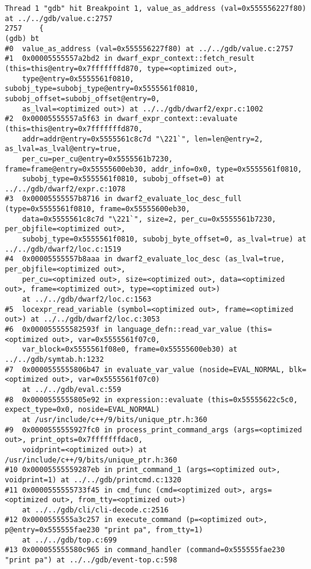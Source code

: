 \documentclass{report}
\begin{document}
\begin{verbatim}
Thread 1 "gdb" hit Breakpoint 1, value_as_address (val=0x555556227f80) at ../../gdb/value.c:2757
2757	{
(gdb) bt
#0  value_as_address (val=0x555556227f80) at ../../gdb/value.c:2757
#1  0x00005555557a2bd2 in dwarf_expr_context::fetch_result (this=this@entry=0x7fffffffd870, type=<optimized out>, 
    type@entry=0x5555561f0810, subobj_type=subobj_type@entry=0x5555561f0810, subobj_offset=subobj_offset@entry=0, 
    as_lval=<optimized out>) at ../../gdb/dwarf2/expr.c:1002
#2  0x00005555557a5f63 in dwarf_expr_context::evaluate (this=this@entry=0x7fffffffd870, 
    addr=addr@entry=0x5555561c8c7d "\221`", len=len@entry=2, as_lval=as_lval@entry=true, 
    per_cu=per_cu@entry=0x5555561b7230, frame=frame@entry=0x55555600eb30, addr_info=0x0, type=0x5555561f0810, 
    subobj_type=0x5555561f0810, subobj_offset=0) at ../../gdb/dwarf2/expr.c:1078
#3  0x00005555557b8716 in dwarf2_evaluate_loc_desc_full (type=0x5555561f0810, frame=0x55555600eb30, 
    data=0x5555561c8c7d "\221`", size=2, per_cu=0x5555561b7230, per_objfile=<optimized out>, 
    subobj_type=0x5555561f0810, subobj_byte_offset=0, as_lval=true) at ../../gdb/dwarf2/loc.c:1519
#4  0x00005555557b8aaa in dwarf2_evaluate_loc_desc (as_lval=true, per_objfile=<optimized out>, 
    per_cu=<optimized out>, size=<optimized out>, data=<optimized out>, frame=<optimized out>, type=<optimized out>)
    at ../../gdb/dwarf2/loc.c:1563
#5  locexpr_read_variable (symbol=<optimized out>, frame=<optimized out>) at ../../gdb/dwarf2/loc.c:3053
#6  0x000055555582593f in language_defn::read_var_value (this=<optimized out>, var=0x5555561f07c0, 
    var_block=0x5555561f08e0, frame=0x55555600eb30) at ../../gdb/symtab.h:1232
#7  0x0000555555806b47 in evaluate_var_value (noside=EVAL_NORMAL, blk=<optimized out>, var=0x5555561f07c0)
    at ../../gdb/eval.c:559
#8  0x0000555555805e92 in expression::evaluate (this=0x55555622c5c0, expect_type=0x0, noside=EVAL_NORMAL)
    at /usr/include/c++/9/bits/unique_ptr.h:360
#9  0x0000555555927fc0 in process_print_command_args (args=<optimized out>, print_opts=0x7fffffffdac0, 
    voidprint=<optimized out>) at /usr/include/c++/9/bits/unique_ptr.h:360
#10 0x00005555559287eb in print_command_1 (args=<optimized out>, voidprint=1) at ../../gdb/printcmd.c:1320
#11 0x0000555555733f45 in cmd_func (cmd=<optimized out>, args=<optimized out>, from_tty=<optimized out>)
    at ../../gdb/cli/cli-decode.c:2516
#12 0x0000555555a3c257 in execute_command (p=<optimized out>, p@entry=0x555555fae230 "print pa", from_tty=1)
    at ../../gdb/top.c:699
#13 0x000055555580c965 in command_handler (command=0x555555fae230 "print pa") at ../../gdb/event-top.c:598

\end{verbatim}
\end{document}
